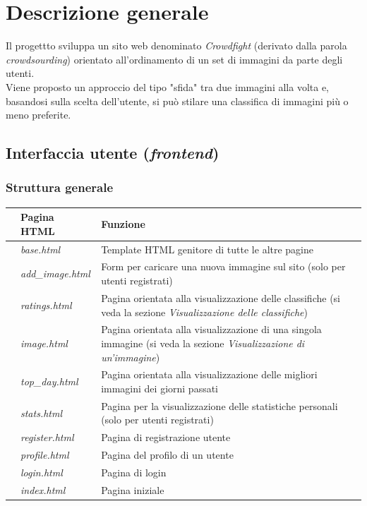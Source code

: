 \documentclass{scrreprt}
\begin{document}
\chapter{Descrizione generale}

Il progettto sviluppa un sito web denominato \textit{Crowdfight} (derivato dalla parola \textit{crowdsourding}) orientato all'ordinamento di un set di immagini da parte degli utenti.\\
Viene proposto un approccio del tipo "sfida" tra due immagini alla volta e, basandosi sulla scelta dell'utente, si può stilare una classifica di immagini più o meno preferite.


\section{Interfaccia utente (\textit{frontend})}

\subsection{Struttura generale}

\newcommand{\structure}{\stepcounter{countStr}\thecountStr}

\FloatBarrier
\begin{table}[h|]
\centering
\begin{tabular}{|l|l|p{10cm}|}
\hline
 & \textbf{Pagina HTML} & \textbf{Funzione} \\ \hline
\structure & \textit{base.html} & Template HTML genitore di tutte le altre pagine \\ \hline
\structure & \textit{add_image.html} & Form per caricare una nuova immagine sul sito (solo per utenti registrati) \\ \hline
\structure & \textit{ratings.html} & Pagina orientata alla visualizzazione delle classifiche (si veda la sezione \textit{Visualizzazione delle classifiche}) \\ \hline
\structure & \textit{image.html} & Pagina orientata alla visualizzazione di una singola immagine (si veda la sezione \textit{Visualizzazione di un'immagine}) \\ \hline
\structure & \textit{top_day.html} & Pagina orientata alla visualizzazione delle migliori immagini dei giorni passati  \\ \hline
\structure & \textit{stats.html} & Pagina per la visualizzazione delle statistiche personali (solo per utenti registrati)\\ \hline
\structure & \textit{register.html} & Pagina di registrazione utente \\ \hline
\structure & \textit{profile.html} & Pagina del profilo di un utente \\ \hline
\structure & \textit{login.html} & Pagina di login \\ \hline
\structure & \textit{index.html} & Pagina iniziale \\ \hline
\end{tabular}
\end{table}
\FloatBarrier
\end{document}
